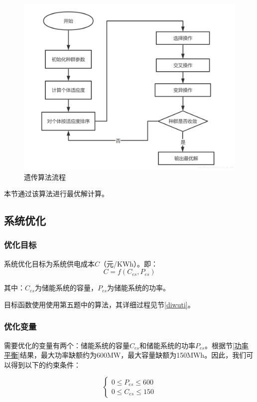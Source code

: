 \documentclass{cumcmthesis}
\begin{document}
	\begin{figure}[H]
		\centering
		\includegraphics[width=0.7\linewidth]{figures/screenshot001}
		\caption{遗传算法流程}
		\label{fig:screenshot001}
	\end{figure}
	
	本节通过该算法进行最优解计算。
	
	\subsection{系统优化}
	\subsubsection{优化目标}
	系统优化目标为系统供电成本$ C $（元/KWh）。即：
	\begin{equation}\label{key}
	C=f(C_{es},P_{es})
	\end{equation}

	其中：$ C_{es} $为储能系统的容量，$ P_{es} $为储能系统的功率。
	
	目标函数使用使用第五题中的算法，其详细过程见节\ref{diwuti}。
	\subsubsection{优化变量}
	
	需要优化的变量有两个：储能系统的容量$ C_{es} $和储能系统的功率$ P_{es} $。根据节\ref{功率平衡}结果，最大功率缺额约为600MW，最大容量缺额为150MWh。因此，我们可以得到以下的约束条件：
	
	\begin{equation}\label{ystj}
		\left\{\begin{matrix}
		0\leq P_{es}\leq 600\\
		0\leq C_{es}\leq 150
		\end{matrix}\right.
	\end{equation}
	
\end{document}
